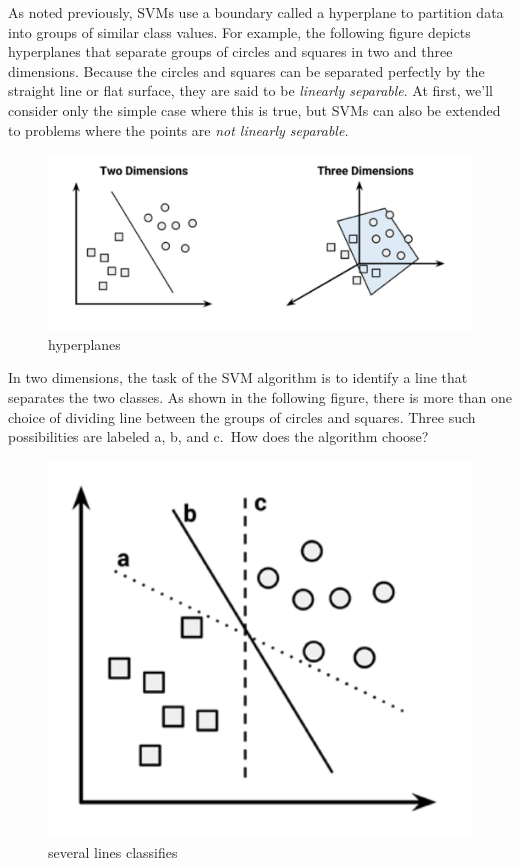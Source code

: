\documentclass[
]{article}
\begin{document}
As noted previously, SVMs use a boundary called a hyperplane to
partition data into groups of similar class values. For example, the
following figure depicts hyperplanes that separate groups of circles and
squares in two and three dimensions. Because the circles and squares can
be separated perfectly by the straight line or flat surface, they are
said to be \emph{linearly separable}. At first, we'll consider only the
simple case where this is true, but SVMs can also be extended to
problems where the points are \emph{not linearly separable.}

\begin{figure}

{\centering \includegraphics[width=0.5\linewidth,]{images/hyperplane} 

}

\caption{hyperplanes}\label{fig:fig1}
\end{figure}

In two dimensions, the task of the SVM algorithm is to identify a line
that separates the two classes. As shown in the following figure, there
is more than one choice of dividing line between the groups of circles
and squares. Three such possibilities are labeled a, b, and c.~How does
the algorithm choose?

\begin{figure}

{\centering \includegraphics[width=0.5\linewidth,]{images/severallines} 

}

\caption{several lines classifies}\label{fig:fig2}
\end{figure}
\end{document}

